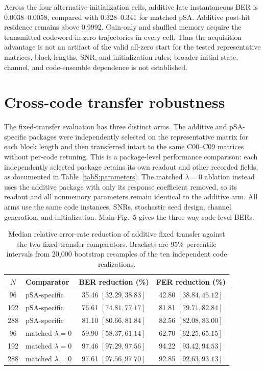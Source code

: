 \documentclass[aps,prapplied,preprint,superscriptaddress,longbibliography,floatfix]{revtex4-2}
\newcommand{\psa}{pSA}
\begin{document}
Across the four alternative-initialization cells, additive late instantaneous BER is 0.0038--0.0058, compared with 0.328--0.341 for matched \psa{}.  Additive post-hit residence remains above 0.9992.  Gain-only and shuffled memory acquire the transmitted codeword in zero trajectories in every cell.  Thus the acquisition advantage is not an artifact of the valid all-zero start for the tested representative matrices, block lengths, SNR, and initialization rules; broader initial-state, channel, and code-ensemble dependence is not established.

\section{Cross-code transfer robustness}

The fixed-transfer evaluation has three distinct arms.  The additive and pSA-specific packages were independently selected on the representative matrix for each block length and then transferred intact to the same C00--C09 matrices without per-code retuning.  This is a package-level performance comparison: each independently selected package retains its own readout and other recorded fields, as documented in Table~\ref{tabS:parameters}.  The matched $\lambda=0$ ablation instead uses the additive package with only its response coefficient removed, so its readout and all nonmemory parameters remain identical to the additive arm.  All arms use the same code instances, SNRs, stochastic seed design, channel generation, and initialization.  Main Fig.~5 gives the three-way code-level BERs.

\begin{table}[ht]
\caption{Median relative error-rate reduction of additive fixed transfer against the two fixed-transfer comparators.  Brackets are 95\% percentile intervals from 20,000 bootstrap resamples of the ten independent code realizations.}
\label{tabS:transfer-effects}
\begin{ruledtabular}
\begin{tabular}{clcc}
$N$ & Comparator & BER reduction (\%) & FER reduction (\%) \\
\hline
96  & pSA-specific & 35.46 $[32.29,38.83]$ & 42.80 $[38.84,45.12]$ \\
192 & pSA-specific & 76.61 $[74.81,77.17]$ & 81.81 $[79.71,82.84]$ \\
288 & pSA-specific & 81.10 $[80.66,81.84]$ & 82.56 $[82.08,83.00]$ \\
96  & matched $\lambda=0$ & 59.90 $[58.37,61.14]$ & 62.70 $[62.25,65.15]$ \\
192 & matched $\lambda=0$ & 97.46 $[97.29,97.56]$ & 94.22 $[93.42,94.53]$ \\
288 & matched $\lambda=0$ & 97.61 $[97.56,97.70]$ & 92.85 $[92.63,93.13]$ \\
\end{tabular}
\end{ruledtabular}
\end{table}
\end{document}
